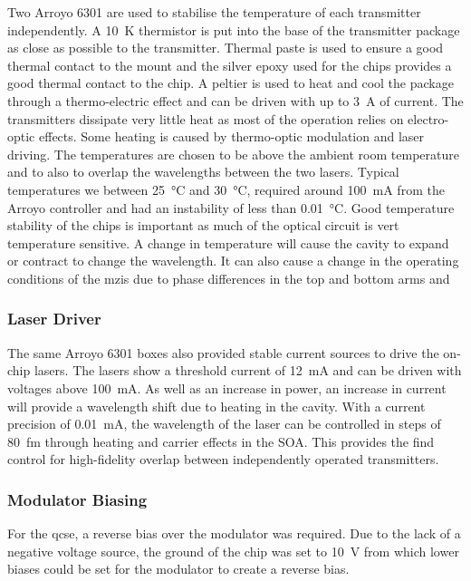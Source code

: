 Two Arroyo 6301 are used to stabilise the temperature of each transmitter independently. A \SI{10}{K} thermistor is put into the base of the transmitter package as close as possible to the transmitter. Thermal paste is used to ensure a good thermal contact to the mount and the silver epoxy used for the chips provides a good thermal contact to the chip. A peltier is used to heat and cool the package through a thermo-electric effect and can be driven with up to \SI{3}{A} of current. The transmitters dissipate very little heat as most of the operation relies on electro-optic effects. Some heating is caused by thermo-optic modulation and laser driving. The temperatures are chosen to be above the ambient room temperature and to also to overlap the wavelengths between the two lasers. Typical temperatures we between \SI{25}{\celsius} and \SI{30}{\celsius}, required around \SI{100}{mA} from the Arroyo controller and had an instability of less than \SI{0.01}{\celsius}. Good temperature stability of the chips is important as much of the optical circuit is vert temperature sensitive. A change in temperature will cause the cavity to expand or contract to change the wavelength. It can also cause a change in the operating conditions of the \acp{mzi} due to phase differences in the top and bottom arms and  

\subsubsection*{Laser Driver}

The same Arroyo 6301 boxes also provided stable current sources to drive the on-chip lasers. The lasers show a threshold current of \SI{12}{mA} and can be driven with voltages above \SI{100}{mA}. As well as an increase in power, an increase in current will provide a wavelength shift due to heating in the cavity. With a current precision of \SI{0.01}{mA}, the wavelength of the laser can be controlled in steps of \SI{80}{fm} through heating and carrier effects in the \ac{SOA}. This provides the find control for high-fidelity overlap between independently operated transmitters. 

\subsubsection*{Modulator Biasing}

For the \ac{qcse}, a reverse bias over the modulator was required. Due to the lack of a negative voltage source, the ground of the chip was set to \SI{10}{V} from which lower biases could be set for the modulator to create a reverse bias.

